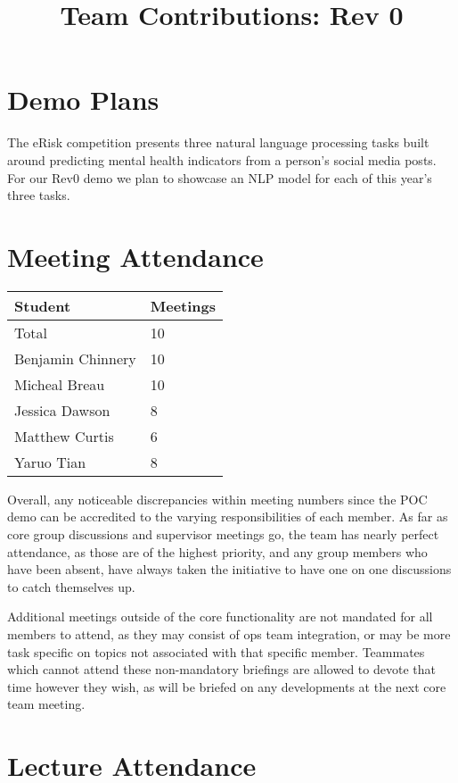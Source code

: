 \documentclass{article}
\title{Team Contributions: Rev 0\\\progname}
\author{\authname}
\date{}
\begin{document}
\maketitle

\section{Demo Plans}

The eRisk competition presents three natural language processing tasks built around predicting mental health indicators from a person's social media posts. For our Rev0 demo we plan to showcase an NLP model for each of this year's three tasks.

\section{Meeting Attendance}

\begin{table}[H]
\centering
\begin{tabular}{ll}
\toprule
\textbf{Student} & \textbf{Meetings}\\
\midrule
Total & 10\\
Benjamin Chinnery & 10\\
Micheal Breau & 10\\
Jessica Dawson & 8\\
Matthew Curtis & 6\\
Yaruo Tian & 8\\
\bottomrule
\end{tabular}
\end{table}
Overall, any noticeable discrepancies within meeting numbers since the POC demo can be accredited to the varying responsibilities of each member. As far as core group discussions and supervisor meetings go, the team has nearly perfect attendance, as those are of the highest priority, and any group members who have been absent, have always taken the initiative to have one on one discussions to catch themselves up.

Additional meetings outside of the core functionality are not mandated for all members to attend, as they may consist of ops team integration, or may be more task specific on topics not associated with that specific member. Teammates which cannot attend these non-mandatory briefings are allowed to devote that time however they wish, as will be briefed on any developments at the next core team meeting.


\section{Lecture Attendance}
\end{document}
